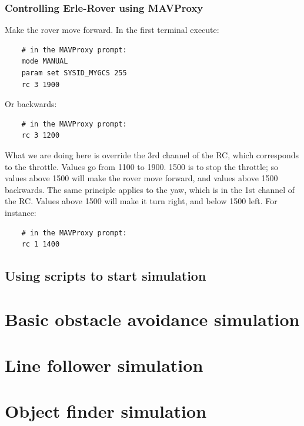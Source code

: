 \documentclass{report}
\begin{document}
\subsubsection{Controlling Erle-Rover using MAVProxy}
Make the rover move forward. In the first terminal execute:
\begin{lstlisting}
	# in the MAVProxy prompt:
	mode MANUAL
	param set SYSID_MYGCS 255
	rc 3 1900
\end{lstlisting}
Or backwards:
\begin{lstlisting}
	# in the MAVProxy prompt:
	rc 3 1200
\end{lstlisting}
What we are doing here is override the 3rd channel of the RC, which corresponds to the throttle. Values go from 1100 to 1900. 1500 is to stop the throttle; so values above 1500 will make the rover move forward, and values above 1500 backwards. The same principle applies to the yaw, which is in the 1st channel of the RC. Values above 1500 will make it turn right, and below 1500 left. For instance:
\begin{lstlisting}
	# in the MAVProxy prompt:
	rc 1 1400
\end{lstlisting}

\subsection{Using scripts to start simulation}


\section{Basic obstacle avoidance simulation}

\section{Line follower simulation}

\section{Object finder simulation}
\end{document}
